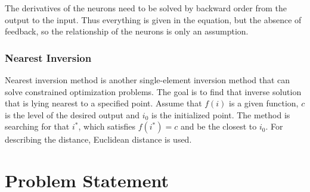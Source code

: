 The derivatives of the neurons need to be solved by backward order from the output to the input. Thus everything is given in the equation, but the absence of feedback, so the relationship of the neurons is only an assumption.



\subsubsection{Nearest Inversion}

Nearest inversion method is another single-element inversion method that can solve constrained optimization problems. The goal is to find that inverse solution that is lying nearest to a specified point. 
Assume that $f(i)$ is a given function, $c$ is the level of the desired output and $i_0$ is the initialized point. The method is searching for that $i^*$, which satisfies $f(i^*) = c$ and be the closest to $i_0$. For describing the distance, Euclidean distance is used.




\section{Problem Statement}

